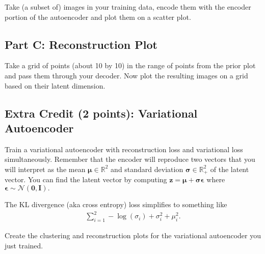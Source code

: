 \documentclass{article}
\begin{document}
Take (a subset of) images in your training data, encode them with the encoder portion of the autoencoder and plot them on a scatter plot.

\subsection*{Part C: Reconstruction Plot}

Take a grid of points (about 10 by 10) in the range of points from the prior plot and pass them through your decoder.
Now plot the resulting images on a grid based on their latent dimension.

\subsection*{Extra Credit (2 points): Variational Autoencoder}

Train a variational autoencoder with reconstruction loss and variational loss simultaneously.
Remember that the encoder will reproduce two vectors that you will interpret as the mean $\bm{\mu} \in \mathbb{R}^2$ and standard deviation $\bm{\sigma} \in \mathbb{R}_+^2$ of the latent vector.
You can find the latent vector by computing $\mathbf{z} = \bm{\mu} + \bm{\sigma} \bm{\epsilon}$ where $\bm{\epsilon} \sim \mathcal{N}(\bm{0}, \bm{I}).$

The KL divergence (aka cross entropy) loss simplifies to something like
\begin{align}
    \sum_{i=1}^2 -\log(\sigma_i) + \sigma_i^2 + \mu_i^2.
\end{align}

Create the clustering and reconstruction plots for the variational autoencoder you just trained.

%
\end{document}
